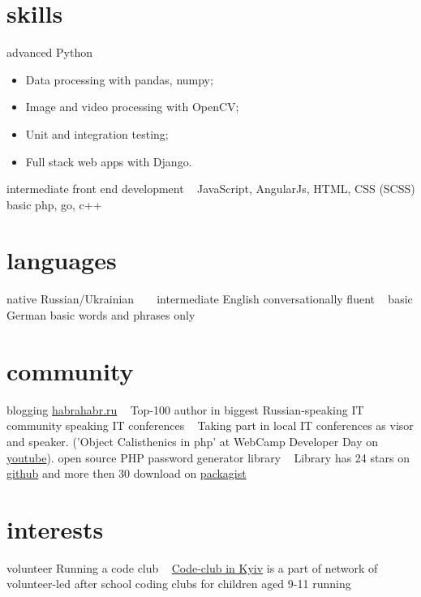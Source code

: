 \documentclass[hidelinks,a4paper]{cv}
\begin{document}
\section{skills}
\begin{entrylist}
  \entry
   {advanced}
   {Python}
   {~}
   {
   \begin{itemize}
      \item Data processing with pandas, numpy;
      \item Image and video processing with OpenCV;
      \item Unit and integration testing;
      \item Full stack web apps with Django.
    \end{itemize}
   }
  \entry
   {intermediate}
   {front end development}
   {~}
   {JavaScript, AngularJs, HTML, CSS (SCSS)}
  \entry
   {basic}
   {php, go, c++}
   {~}
   {~}
\end{entrylist}

\section{languages}
\begin{entrylist}
  \entry
   {native}
   {Russian/Ukrainian}
   {~}
   {~}
  \entry
   {intermediate}
   {English}
   {conversationally fluent}
   {~}
  \entry
   {basic}
   {German}
   {basic words and phrases only}
   {~}
\end{entrylist}

\section{community}
\begin{entrylist}
   \entry
    {blogging}
    {\href{http://habrahabr.ru/users/patapsmile/}{habrahabr.ru}}
    {~}
    {Top-100 author in biggest Russian-speaking IT community}
   \entry
    {speaking}
    {IT conferences}
    {~}
    {Taking part in local IT conferences as visor and speaker. 
    ('Object Calisthenics in php' at WebCamp Developer Day on \href{https://www.youtube.com/watch?v=jVPtLG7q8OQ}{youtube}). 
    }
   \entry
    {open source}
    {PHP password generator library}
    {~}
    {Library has 24 stars on \href{https://github.com/denys-potapov/password-generator}{github} and more then 30 download on \href{https://packagist.org/packages/barzo/password-generator}{packagist}
    }
\end{entrylist}


\section{interests}
\begin{entrylist}
   \entry
    {volunteer}
    {Running a code club}
    {~}
    {\href{https://www.codeclub.org.uk/}{Code-club in Kyiv} is a part of network of volunteer-led after school coding clubs for children aged 9-11}
   \entry
    {running}
    {~}
    {~}
    {~}
\end{entrylist}
\end{document}
